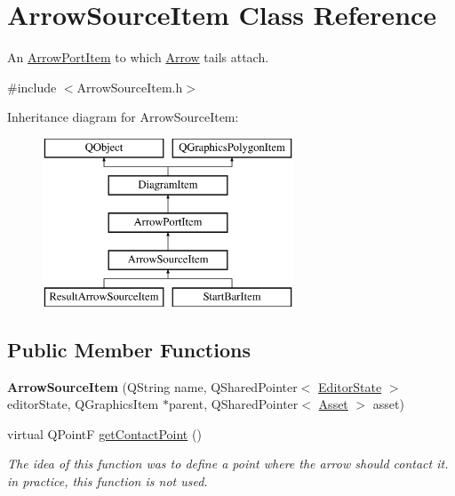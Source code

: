 \hypertarget{class_arrow_source_item}{\section{Arrow\-Source\-Item Class Reference}
\label{class_arrow_source_item}
}


An \hyperlink{class_arrow_port_item}{Arrow\-Port\-Item} to which \hyperlink{class_arrow}{Arrow} tails attach.  




{\ttfamily \#include $<$Arrow\-Source\-Item.\-h$>$}

Inheritance diagram for Arrow\-Source\-Item\-:\begin{figure}[H]
\begin{center}
\leavevmode
\includegraphics[height=5.000000cm]{class_arrow_source_item}
\end{center}
\end{figure}
\subsection*{Public Member Functions}
\begin{DoxyCompactItemize}
\item 
\hypertarget{class_arrow_source_item_acf013d5d37182de531c144bb3e536c66}{{\bfseries Arrow\-Source\-Item} (Q\-String name, Q\-Shared\-Pointer$<$ \hyperlink{class_editor_state}{Editor\-State} $>$ editor\-State, Q\-Graphics\-Item $\ast$parent, Q\-Shared\-Pointer$<$ \hyperlink{class_picto_1_1_asset}{Asset} $>$ asset)}\label{class_arrow_source_item_acf013d5d37182de531c144bb3e536c66}

\item 
\hypertarget{class_arrow_source_item_a9b43e19774dec3b9298d71dc1e0a688d}{virtual Q\-Point\-F \hyperlink{class_arrow_source_item_a9b43e19774dec3b9298d71dc1e0a688d}{get\-Contact\-Point} ()}\label{class_arrow_source_item_a9b43e19774dec3b9298d71dc1e0a688d}

\begin{DoxyCompactList}\small\item\em The idea of this function was to define a point where the arrow should contact it. in practice, this function is not used. \end{DoxyCompactList}\end{DoxyCompactItemize}
